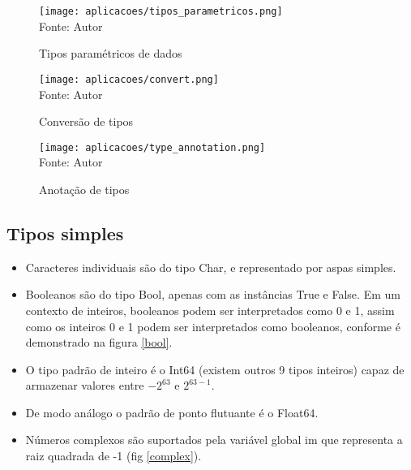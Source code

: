     \begin{figure}[H]
    \begin{center}
        \caption{Tipos paramétricos de dados} \label{tipos_parametricos}
        \texttt{[image: aplicacoes/tipos\_parametricos.png]} \\
        {\tiny \sf Fonte: Autor}
    \end{center}
    \end{figure}

    \begin{figure}[H]
    \begin{center}
        \caption{Conversão de tipos} \label{conversao}
        \texttt{[image: aplicacoes/convert.png]} \\
        {\tiny \sf Fonte: Autor}
    \end{center}
    \end{figure}


    \begin{figure}[H]
    \begin{center}
        \caption{Anotação de tipos} \label{anotacao_tipo}
        \texttt{[image: aplicacoes/type\_annotation.png]} \\
        {\tiny \sf Fonte: Autor}
    \end{center}
    \end{figure} 

    \subsection{Tipos simples}
    \begin{itemize}
      \item Caracteres individuais são do tipo Char, e representado por aspas simples.
      \item Booleanos são do tipo Bool, apenas com as instâncias True e False. Em um contexto de inteiros, booleanos podem ser interpretados como 0 e 1, assim como os inteiros 0 e 1 podem ser interpretados como booleanos, conforme é demonstrado na figura \ref{bool}.  
    \item O tipo padrão de inteiro é o Int64 (existem outros 9 tipos inteiros) capaz de armazenar valores entre $-2^{63}$ e $2^{63-1}$.
    \item De modo análogo o padrão de ponto flutuante é o Float64.
    \item Números complexos são suportados pela variável global im que representa a raiz quadrada de -1 (fig \ref{complex}).
  \end{itemize}
 
